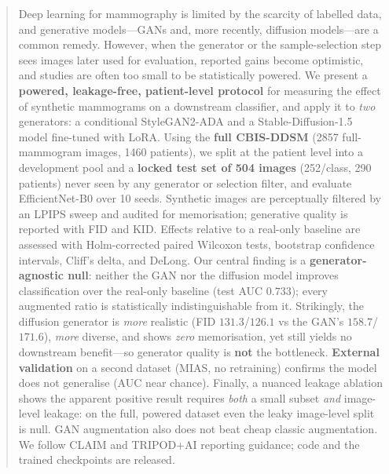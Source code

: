 \documentclass[runningheads]{llncs}
\begin{document}
\begin{abstract}
Deep learning for mammography is limited by the scarcity of labelled data, and
generative models---GANs and, more recently, diffusion models---are a common
remedy. However, when the generator or the sample-selection step sees images
later used for evaluation, reported gains become optimistic, and studies are
often too small to be statistically powered. We present a \textbf{powered,
leakage-free, patient-level protocol} for measuring the effect of synthetic
mammograms on a downstream classifier, and apply it to \emph{two} generators: a
conditional StyleGAN2-ADA and a Stable-Diffusion-1.5 model fine-tuned with LoRA.
Using the \textbf{full CBIS-DDSM} (2857 full-mammogram images, 1460 patients),
we split at the patient level into a development pool and a \textbf{locked test
set of 504 images} (252/class, 290 patients) never seen by any generator or
selection filter, and evaluate EfficientNet-B0 over 10 seeds. Synthetic images
are perceptually filtered by an LPIPS sweep and audited for memorisation;
generative quality is reported with FID and KID. Effects relative to a real-only
baseline are assessed with Holm-corrected paired Wilcoxon tests, bootstrap
confidence intervals, Cliff's delta, and DeLong. Our central finding is a
\textbf{generator-agnostic null}: neither the GAN nor the diffusion model
improves classification over the real-only baseline (test AUC $0.733$); every
augmented ratio is statistically indistinguishable from it. Strikingly, the
diffusion generator is \emph{more} realistic (FID $131.3$/$126.1$ vs the GAN's
$158.7$/$171.6$), \emph{more} diverse, and shows \emph{zero} memorisation, yet
still yields no downstream benefit---so generator quality is \textbf{not} the
bottleneck. \textbf{External validation} on a second dataset (MIAS, no
retraining) confirms the model does not generalise (AUC near chance). Finally, a
nuanced leakage ablation shows the apparent positive result requires \emph{both}
a small subset \emph{and} image-level leakage: on the full, powered dataset even
the leaky image-level split is null. GAN augmentation also does not beat cheap
classic augmentation. We follow CLAIM and TRIPOD+AI reporting guidance; code and
the trained checkpoints are released.

\end{abstract}

\end{document}
